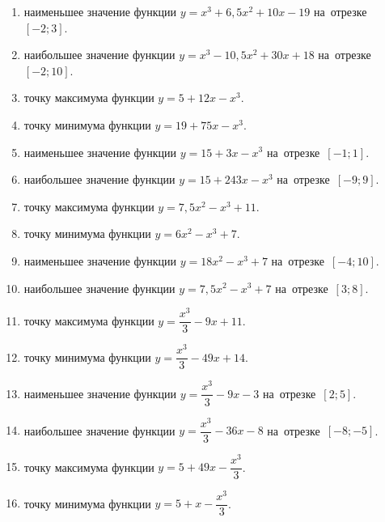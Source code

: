 \documentclass[a4paper,10pt]{article}
\begin{document}
\begin{enumerate}
\item {} наименьшее значение функции $y=x^3 +6,5x^2+10x-19$ на~отрезке~$\left[-2;3\right]$.

\item {} наибольшее значение функции $y=x^3 -10,5x^2+30x+18$ на~отрезке~$\left[-2;10\right]$.

\item {} точку максимума функции $y=5+12x-x^3$.

\item {} точку минимума функции $y=19+75x-x^3$.

\item {} наименьшее значение функции $y=15+3x-x^3$ на~отрезке~$\left[-1;1\right]$.

\item {} наибольшее значение функции $y=15+243x-x^3$ на~отрезке~$\left[-9;9\right]$.

\item {} точку максимума функции $y=7,5x^2-x^3+11$.

\item {} точку минимума функции $y=6x^2-x^3+7$.

\item {} наименьшее значение функции $y=18x^2-x^3+7$ на~отрезке~$\left[-4;10\right]$.

\item {} наибольшее значение функции $y=7,5x^2-x^3+7$ на~отрезке~$\left[3;8\right]$.

\item {} точку максимума функции $y=\dfrac{x^3}{3} -9x+11$.

\item {} точку минимума функции $y=\dfrac{x^3}{3} -49x+14$.

\item {} наименьшее значение функции $y=\dfrac{x^3}{3} -9x-3$ на~отрезке~$\left[2;5\right]$.

\item {} наибольшее значение функции $y=\dfrac{x^3}{3} -36x-8$ на~отрезке~$\left[-8;-5\right]$.

\item {} точку максимума функции $y=5 +49x-\dfrac{x^3}{3}$.

\item {} точку минимума функции $y=5 +x-\dfrac{x^3}{3}$.


\end{enumerate}
\end{document}
